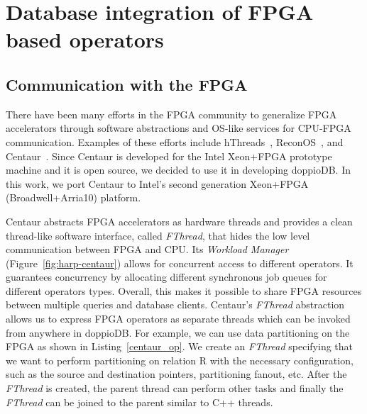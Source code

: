 \documentclass[11pt,dvipdfm]{article}
\begin{document}
\section{Database integration of FPGA based operators}
\label{sec:HAL}

\subsection{Communication with the FPGA}
\label{sec:centaur}

There have been many efforts in the FPGA community to generalize FPGA accelerators through software abstractions and OS-like services for CPU-FPGA communication. Examples of these efforts include hThreads~\cite{andrews2004hybridthreads}, ReconOS~\cite{lubbers2009reconos}, and Centaur~\cite{owaida-fccm2017}. Since Centaur is developed for the Intel Xeon+FPGA prototype machine and it is open source, we decided to use it in developing doppioDB. 
In this work, we port Centaur to Intel's second generation Xeon+FPGA (Broadwell+Arria10) platform.

Centaur abstracts FPGA accelerators as hardware threads and provides a clean thread-like software interface, called \emph{FThread}, that hides the low level communication between FPGA and CPU. Its \emph{Workload Manager} (Figure~\ref{fig:harp-centaur}) allows for concurrent access to different operators. It guarantees concurrency by allocating different synchronous job queues for different operators types. Overall, this makes it possible to share FPGA resources between multiple queries and database clients. Centaur's \emph{FThread} abstraction allows us to express FPGA operators as separate threads which can be invoked from anywhere in doppioDB. For example, we can use data partitioning on the FPGA as shown in Listing~\ref{centaur_op}. We create an \emph{FThread} specifying that we want to perform partitioning on relation R with the necessary configuration, such as the source and destination pointers, partitioning fanout, etc. After the \emph{FThread} is created, the parent thread can perform other tasks and finally the \emph{FThread} can be joined to the parent similar to C++ threads.
\end{document}
